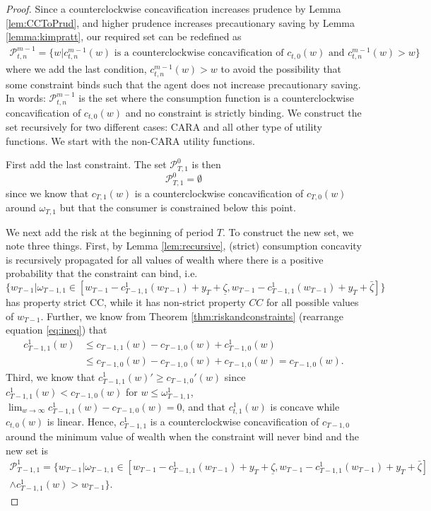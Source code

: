 \documentclass[titlepage]{\econtex}
\providecommand{\wAlt}{\omega}
\begin{document}
\begin{proof}
    Since a counterclockwise concavification increases prudence by Lemma \ref{lem:CCToPrud}, and higher prudence increases precautionary saving by Lemma \ref{lemma:kimpratt}, our required set can be redefined as 
    \begin{align*} \mathcal{P}_{t,n}^{m-1} = \{w | c_{t,n}^{m-1}(w) \text{ is a counterclockwise concavification of } c_{t,0}(w) \text{ and } c_{t,n}^{m-1}(w) > w
      \}\end{align*}
    where we add the last condition, $c_{t,n}^{m-1}(w) > w$ to avoid the possibility that some constraint binds such that the agent does not increase precautionary saving. In words: $\mathcal{P}_{t,n}^{m-1}$ is the set where the consumption function is a counterclockwise concavification of $c_{t,0}(w)$ and no constraint is strictly binding. We construct the set recursively for two different cases: CARA and all other type of utility functions. We start with the non-CARA utility functions. 
    
    First add the last constraint. The set $\mathcal{P}_{T,1}^0$ is then 
    \[\mathcal{P}_{T,1}^0 = \emptyset \]%
    since we know that $c_{T,1}(w)$ is a counterclockwise concavification of $c_{T,0}(w)$ around $\wAlt_{T,1}$ but that the consumer is constrained below this point.
    
    We next add the risk at the beginning of period $T$. To construct the new set, we note three things. First, by Lemma \ref{lem:recursive},  (strict) consumption concavity is recursively propagated for all values of wealth where there is a positive probability that the constraint can bind, i.e. 
    \[\{w_{T-1} | \wAlt_{T-1,1} \in \left[w_{T-1} - c_{T-1,1}^1(w_{T-1}) + {y}_{T} + \underline{\zeta} ,w_{T-1} - c_{T-1,1}^1(w_{T-1}) + {y}_{T} + \bar{\zeta}\right] \}\]
    has property strict CC, while it has non-strict property $CC$ for all possible values of $w_{T-1}$. Further, we know from Theorem \ref{thm:riskandconstraints} (rearrange equation \eqref{eq:ineq}) that
    \begin{align*}{c}_{T-1,1}^1(w)  & \leq c_{T-1,1}(w) - c_{T-1,0}(w) + {c}_{T-1,0}^1(w) \\ &\leq c_{T-1,0}(w) - c_{T-1,0}(w) + c_{T-1,0}(w) = c_{T-1,0}(w).\end{align*}
    Third, we know that $c_{T-1,1}^{1}(w)' \geq c_{T-1,0}'(w)$ since ${c}_{T-1,1}^1(w) < c_{T-1,0}(w)$ for $w \leq \wAlt_{T-1,1}^1$, $\lim_{w\rightarrow \infty} c_{T-1,1}^1(w) - c_{T-1,0}(w) = 0$, and that $c_{t,1}^1(w)$ is concave while $c_{t,0}(w)$ is linear. Hence, $c_{T-1,1}^1$ is a counterclockwise concavification of $c_{T-1,0}$ around the minimum value of wealth when the constraint will never bind and the new set is
    \begin{align*}\mathcal{P}_{T-1,1}^1 = \{w_{T-1} | \wAlt_{T-1,1} \in \left[w_{T-1} - c_{T-1,1}^1(w_{T-1}) + {y}_{T} + \underline{\zeta}, w_{T-1} - c_{T-1,1}^1(w_{T-1}) + {y}_{T} + \bar{\zeta}\right]   \\ \wedge c_{T-1,1}^1(w) > w_{T-1}\}.\end{align*}
    

\end{proof}
\end{document}
